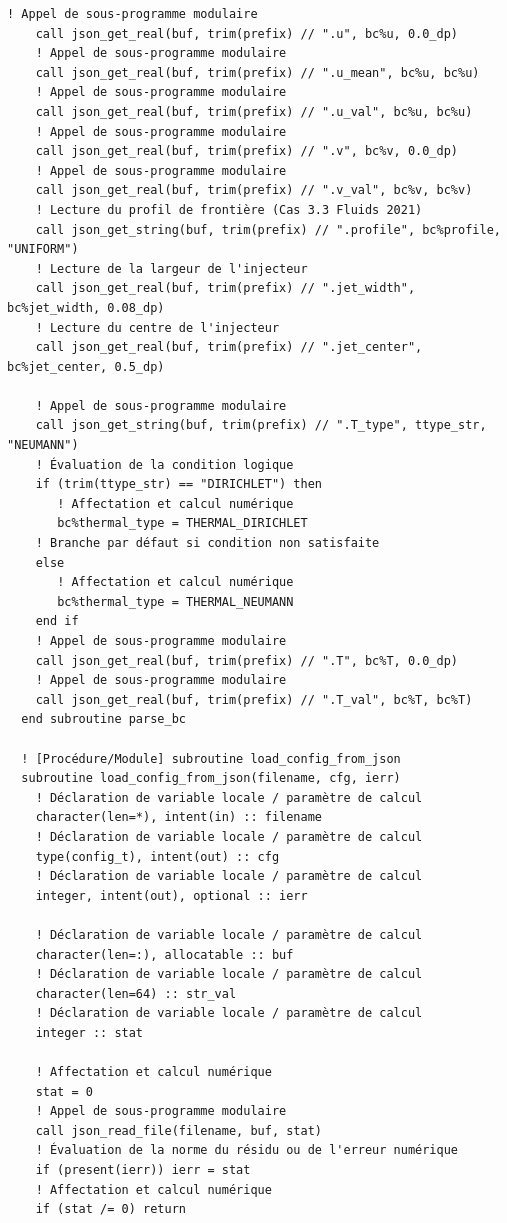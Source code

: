 \documentclass[10pt,a4paper,oneside]{book}
\begin{document}
\begin{lstlisting}[language={[95]Fortran}]
    ! Appel de sous-programme modulaire
    call json_get_real(buf, trim(prefix) // ".u", bc%u, 0.0_dp)
    ! Appel de sous-programme modulaire
    call json_get_real(buf, trim(prefix) // ".u_mean", bc%u, bc%u)
    ! Appel de sous-programme modulaire
    call json_get_real(buf, trim(prefix) // ".u_val", bc%u, bc%u)
    ! Appel de sous-programme modulaire
    call json_get_real(buf, trim(prefix) // ".v", bc%v, 0.0_dp)
    ! Appel de sous-programme modulaire
    call json_get_real(buf, trim(prefix) // ".v_val", bc%v, bc%v)
    ! Lecture du profil de frontière (Cas 3.3 Fluids 2021)
    call json_get_string(buf, trim(prefix) // ".profile", bc%profile, "UNIFORM")
    ! Lecture de la largeur de l'injecteur
    call json_get_real(buf, trim(prefix) // ".jet_width", bc%jet_width, 0.08_dp)
    ! Lecture du centre de l'injecteur
    call json_get_real(buf, trim(prefix) // ".jet_center", bc%jet_center, 0.5_dp)

    ! Appel de sous-programme modulaire
    call json_get_string(buf, trim(prefix) // ".T_type", ttype_str, "NEUMANN")
    ! Évaluation de la condition logique
    if (trim(ttype_str) == "DIRICHLET") then
       ! Affectation et calcul numérique
       bc%thermal_type = THERMAL_DIRICHLET
    ! Branche par défaut si condition non satisfaite
    else
       ! Affectation et calcul numérique
       bc%thermal_type = THERMAL_NEUMANN
    end if
    ! Appel de sous-programme modulaire
    call json_get_real(buf, trim(prefix) // ".T", bc%T, 0.0_dp)
    ! Appel de sous-programme modulaire
    call json_get_real(buf, trim(prefix) // ".T_val", bc%T, bc%T)
  end subroutine parse_bc

  ! [Procédure/Module] subroutine load_config_from_json
  subroutine load_config_from_json(filename, cfg, ierr)
    ! Déclaration de variable locale / paramètre de calcul
    character(len=*), intent(in) :: filename
    ! Déclaration de variable locale / paramètre de calcul
    type(config_t), intent(out) :: cfg
    ! Déclaration de variable locale / paramètre de calcul
    integer, intent(out), optional :: ierr

    ! Déclaration de variable locale / paramètre de calcul
    character(len=:), allocatable :: buf
    ! Déclaration de variable locale / paramètre de calcul
    character(len=64) :: str_val
    ! Déclaration de variable locale / paramètre de calcul
    integer :: stat

    ! Affectation et calcul numérique
    stat = 0
    ! Appel de sous-programme modulaire
    call json_read_file(filename, buf, stat)
    ! Évaluation de la norme du résidu ou de l'erreur numérique
    if (present(ierr)) ierr = stat
    ! Affectation et calcul numérique
    if (stat /= 0) return


\end{lstlisting}
\end{document}
